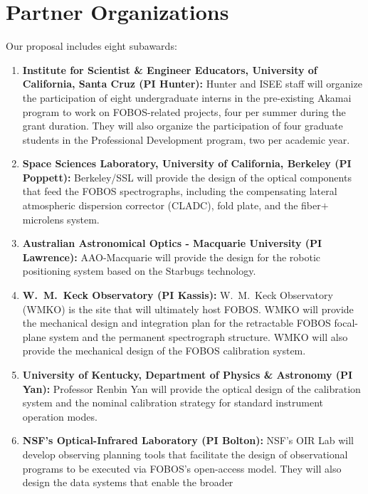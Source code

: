 \documentclass[oneside,11pt]{amsart}
\begin{document}


\vspace*{-1.5cm}

\section*{Partner Organizations}

\noindent Our proposal includes eight subawards:
\begin{enumerate}
%
\item {\bf Institute for Scientist \& Engineer Educators, University
of California, Santa Cruz (PI Hunter):} Hunter and ISEE staff will
organize the participation of eight undergraduate interns in the
pre-existing Akamai program to work on FOBOS-related projects, four
per summer during the grant duration. They will also organize the
participation of four graduate students in the Professional
Development program, two per academic year.
%
\item {\bf Space Sciences Laboratory, University of California,
Berkeley (PI Poppett):} Berkeley/SSL will provide the design of the
optical components that feed the FOBOS spectrographs, including the
compensating lateral atmospheric dispersion corrector (CLADC), fold
plate, and the fiber$+$microlens system.
%
\item {\bf Australian Astronomical Optics - Macquarie University (PI
Lawrence):} AAO-Macquarie will provide the design for the robotic
positioning system based on the Starbugs technology.
%
\item {\bf W.~M.~Keck Observatory (PI Kassis):} W.~M.~Keck
Observatory (WMKO) is the site that will ultimately host FOBOS. WMKO
will provide the mechanical design and integration plan for the
retractable FOBOS focal-plane system and the permanent spectrograph
structure. WMKO will also provide the mechanical design of the FOBOS
calibration system.
%
\item {\bf University of Kentucky, Department of Physics \& Astronomy
(PI Yan):} Professor Renbin Yan will provide the optical design of
the calibration system and the nominal calibration strategy for
standard instrument operation modes.
%
\item {\bf NSF's Optical-Infrared Laboratory (PI Bolton):} NSF's OIR
Lab will develop observing planning tools that facilitate the design
of observational programs to be executed via FOBOS's open-access
model. They will also design the data systems that enable the broader

\end{enumerate}
\end{document}
